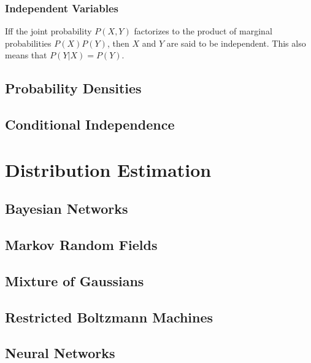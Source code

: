\documentclass{article}
\begin{document}
\subsubsection{Independent Variables}
Iff the joint probability $P(X,Y)$ factorizes to the product of marginal probabilities $P(X)P(Y)$, then $X$ and $Y$ are said to be independent.
This also means that $P(Y|X) = P(Y)$.

\subsection{Probability Densities}

\subsection{Conditional Independence}

\section{Distribution Estimation}

\subsection{Bayesian Networks}

\subsection{Markov Random Fields}

\subsection{Mixture of Gaussians}

\subsection{Restricted Boltzmann Machines}

\subsection{Neural Networks}
\end{document}
